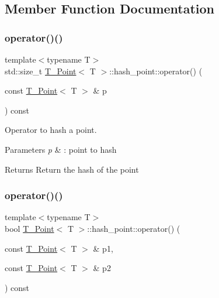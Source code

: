 \subsection{Member Function Documentation}
\mbox{\label{structT__Point_1_1hash__point_a6d41490eb7af074b029db524a80e2e53}} 
\subsubsection{\texorpdfstring{operator()()}{operator()()}\hspace{0.1cm}{\footnotesize\ttfamily [1/2]}}
{\footnotesize\ttfamily template$<$typename T$>$ \\
std\+::size\+\_\+t \hyperlink{classT__Point}{T\+\_\+\+Point}$<$ T $>$\+::hash\+\_\+point\+::operator() (\begin{DoxyParamCaption}\item[{const \hyperlink{classT__Point}{T\+\_\+\+Point}$<$ T $>$ \&}]{p }\end{DoxyParamCaption}) const\hspace{0.3cm}{\ttfamily [inline]}}



Operator to hash a point. 


\begin{DoxyParams}{Parameters}
{\em p} & \+: point to hash \\
\hline
\end{DoxyParams}
\begin{DoxyReturn}{Returns}
Return the hash of the point 
\end{DoxyReturn}
\mbox{\label{structT__Point_1_1hash__point_a92f4c83c6538fcb66804d44e944d7b20}} 
\subsubsection{\texorpdfstring{operator()()}{operator()()}\hspace{0.1cm}{\footnotesize\ttfamily [2/2]}}
{\footnotesize\ttfamily template$<$typename T$>$ \\
bool \hyperlink{classT__Point}{T\+\_\+\+Point}$<$ T $>$\+::hash\+\_\+point\+::operator() (\begin{DoxyParamCaption}\item[{const \hyperlink{classT__Point}{T\+\_\+\+Point}$<$ T $>$ \&}]{p1,  }\item[{const \hyperlink{classT__Point}{T\+\_\+\+Point}$<$ T $>$ \&}]{p2 }\end{DoxyParamCaption}) const\hspace{0.3cm}{\ttfamily [inline]}}



